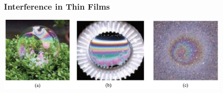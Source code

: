 \documentclass[]{beamer}
\begin{document}
















  
  










\begin{frame}

\frametitle{Interference in Thin Films}

  \begin{center}
  \includegraphics[height=1.5in]{images5/soap.jpg}
\end{center}


  \end{frame}
\end{document}
